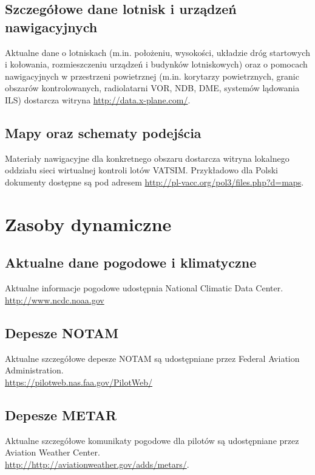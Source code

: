 \documentclass{mwrep}
\begin{document}
\section{Szczegółowe dane lotnisk i urządzeń nawigacyjnych}
Aktualne dane o lotniskach (m.in. położeniu, wysokości, układzie dróg startowych i kołowania, rozmieszczeniu urządzeń i budynków lotniskowych) oraz o pomocach nawigacyjnych w przestrzeni powietrznej (m.in. korytarzy powietrznych, granic obszarów kontrolowanych, radiolatarni VOR, NDB, DME, systemów lądowania ILS) dostarcza witryna \linebreak \url{http://data.x-plane.com/}.

\section{Mapy oraz schematy podejścia}
Materiały nawigacyjne dla konkretnego obszaru dostarcza witryna lokalnego oddziału sieci wirtualnej kontroli lotów VATSIM. Przykładowo dla Polski dokumenty dostępne są pod adresem \url{http://pl-vacc.org/pol3/files.php?d=maps}.

\chapter{Zasoby dynamiczne}

\section{Aktualne dane pogodowe i klimatyczne}
Aktualne informacje pogodowe udostępnia National Climatic Data Center.\\
\url{http://www.ncdc.noaa.gov}

\section{Depesze NOTAM}
Aktualne szczegółowe depesze NOTAM są udostępniane przez Federal Aviation Administration.\\
\url{https://pilotweb.nas.faa.gov/PilotWeb/}

\section{Depesze METAR}
Aktualne szczegółowe komunikaty pogodowe dla pilotów są udostępniane przez Aviation Weather Center.\\
\url{http://http://aviationweather.gov/adds/metars/}.
\end{document}
